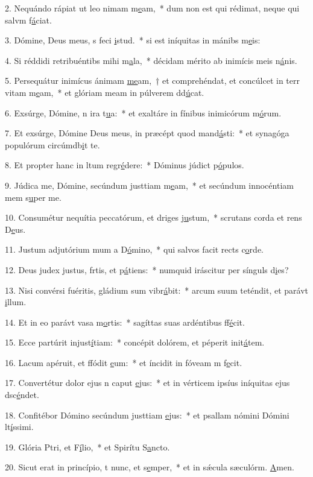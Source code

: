 2. Nequándo rápiat ut leo nimam m\uline{e}am,~* dum non est qui rédimat, neque qui salvm f\uline{á}ciat.\par 
3. Dómine, Deus meus, s feci \uline{i}stud.~* si est iníquitas in mánibs m\uline{e}is:\par 
4. Si réddidi retribuéntibs mihi m\uline{a}la,~* décidam mérito ab inimícis meis n\uline{á}nis.\par 
5. Persequátur inimícus ánimam \uline{me}am,~† et comprehéndat, et concúlcet in terr vitam m\uline{e}am,~* et glóriam meam in púlverem dd\uline{ú}cat.\par 
6. Exsúrge, Dómine, n ira t\uline{u}a:~* et exaltáre in fínibus inimicórum m\uline{ó}rum.\par 
7. Et exsúrge, Dómine Deus meus, in præcépt quod mand\uline{á}sti:~* et synagóga populórum circúmdb\uline{i}t te.\par 
8. Et propter hanc in ltum regr\uline{é}dere:~* Dóminus júdict p\uline{ó}pulos.\par 
9. Júdica me, Dómine, secúndum justtiam m\uline{e}am,~* et secúndum innocéntiam mem s\uline{u}per me.\par 
10. Consumétur nequítia peccatórum, et driges j\uline{u}stum,~* scrutans corda et rens D\uline{e}us.\par 
11. Justum adjutórium mum a D\uline{ó}mino,~* qui salvos facit rects c\uline{o}rde.\par 
12. Deus judex justus, frtis, et p\uline{á}tiens:~* numquid iráscitur per sínguls d\uline{i}es?\par 
13. Nisi convérsi fuéritis, gládium sum vibr\uline{á}bit:~* arcum suum teténdit, et parávt \uline{i}llum.\par 
14. Et in eo parávt vasa m\uline{o}rtis:~* sagíttas suas ardéntibus ff\uline{é}cit.\par 
15. Ecce partúrit injust\uline{í}tiam:~* concépit dolórem, et péperit init\uline{á}tem.\par 
16. Lacum apéruit, et ffódit \uline{e}um:~* et íncidit in fóveam m f\uline{e}cit.\par 
17. Convertétur dolor ejus n caput \uline{e}jus:~* et in vérticem ipsíus iníquitas ejus dsc\uline{é}ndet.\par 
18. Confitébor Dómino secúndum justtiam \uline{e}jus:~* et psallam nómini Dómini lt\uline{í}ssimi.\par 
19. Glória Ptri, et F\uline{í}lio,~* et Spirítu S\uline{a}ncto.\par 
20. Sicut erat in princípio, t nunc, et s\uline{e}mper,~* et in sǽcula sæculórm. \uline{A}men.\par 
